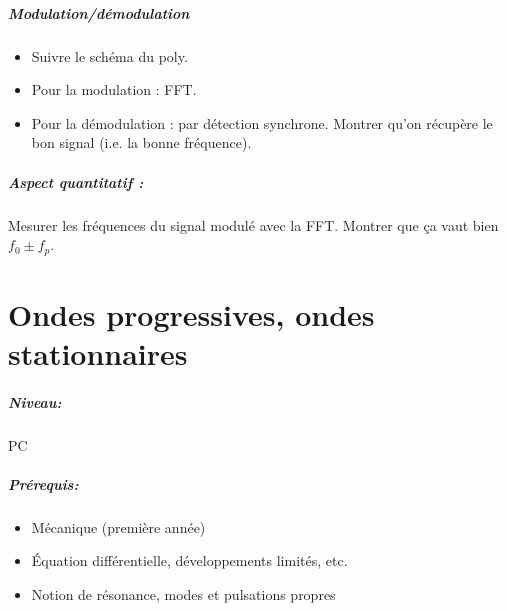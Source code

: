\documentclass[11pt]{report}
\numberwithin{figure}{section}
\numberwithin{equation}{section}
\numberwithin{table}{section}
\newcommand{\1}{\boldsymbol{1}}
\begin{document}
\begin{tcolorbox}[breakable, enhanced, colback=red!2!white,colframe=mycolor!85!black,title=\textbf{\textbf{Expérience}}]
\paragraph*{Modulation/démodulation} 

\begin{itemize}[label=$\triangleright$]
		\item Suivre le schéma du poly.
		\item Pour la modulation : FFT.
		\item Pour la démodulation : par détection synchrone. Montrer qu'on récupère le bon signal (i.e. la bonne fréquence).
\end{itemize}

\paragraph*{Aspect quantitatif :} Mesurer les fréquences du signal modulé avec la FFT. Montrer que ça vaut bien $f_0 \pm f_p$.

\end{tcolorbox}


\newpage




\chapter{Ondes progressives, ondes stationnaires}


\paragraph*{Niveau:} PC 
\paragraph*{Prérequis:} 
\begin{itemize}
\item Mécanique (première année)
\item Équation différentielle, développements limités, etc.
\item Notion de résonance, modes et pulsations propres
\end{itemize}
\end{document}
